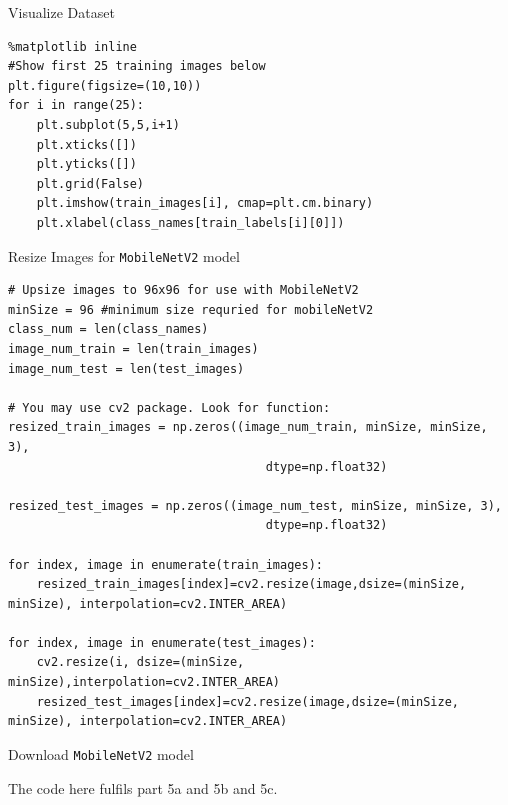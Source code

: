 \documentclass[12pt, letterpaper]{article}
\begin{document}
{\large Visualize Dataset}

\begin{mdframed}[backgroundcolor=bg]
\begin{verbatim}
%matplotlib inline
#Show first 25 training images below
plt.figure(figsize=(10,10))
for i in range(25):
    plt.subplot(5,5,i+1)
    plt.xticks([])
    plt.yticks([])
    plt.grid(False)
    plt.imshow(train_images[i], cmap=plt.cm.binary)
    plt.xlabel(class_names[train_labels[i][0]])
\end{verbatim}
\end{mdframed}

{\large Resize Images for \texttt{MobileNetV2} model}

\begin{mdframed}[backgroundcolor=bg]
\begin{verbatim}
# Upsize images to 96x96 for use with MobileNetV2
minSize = 96 #minimum size requried for mobileNetV2
class_num = len(class_names)
image_num_train = len(train_images)
image_num_test = len(test_images)

# You may use cv2 package. Look for function:
resized_train_images = np.zeros((image_num_train, minSize, minSize, 3), 
                                    dtype=np.float32)

resized_test_images = np.zeros((image_num_test, minSize, minSize, 3), 
                                    dtype=np.float32)

for index, image in enumerate(train_images):
    resized_train_images[index]=cv2.resize(image,dsize=(minSize, minSize), interpolation=cv2.INTER_AREA)

for index, image in enumerate(test_images):
    cv2.resize(i, dsize=(minSize, minSize),interpolation=cv2.INTER_AREA)
    resized_test_images[index]=cv2.resize(image,dsize=(minSize, minSize), interpolation=cv2.INTER_AREA)
\end{verbatim}
\end{mdframed}

{\large Download \texttt{MobileNetV2} model}

The code here fulfils part 5a and 5b and 5c.
\end{document}

